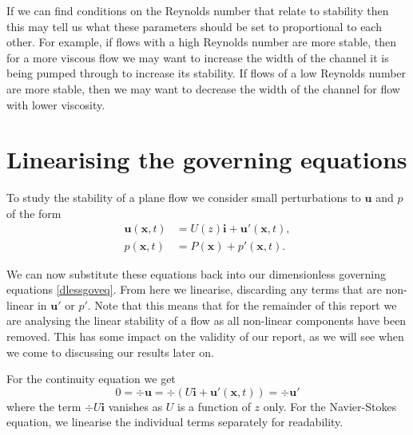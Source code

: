 If we can find conditions on the Reynolds number that relate to stability then this may tell us what these parameters should be set to proportional to each other. For example, if flows with a high Reynolds number are more stable, then for a more viscous flow we may want to increase the width of the channel it is being pumped through to increase its stability. If flows of a low Reynolds number are more stable, then we may want to decrease the width of the channel for flow with lower viscosity.

\section{Linearising the governing equations}

To study the stability of a plane flow we consider small perturbations to $ \mathbf{u} $ and $ p $ of the form
\begin{align}
    \mathbf{u}(\mathbf{x}, t) &= U(z) \mathbf{i} + \mathbf{u}'(\mathbf{x}, t), \nonumber\\
    p(\mathbf{x}, t) &= P(\mathbf{x}) + p'(\mathbf{x}, t).
\end{align}

We can now substitute these equations back into our dimensionless governing equations \eqref{dlessgoveq}. From here we linearise, discarding any terms that are non-linear in  $ \mathbf{u}' $ or  $ p' $. Note that this means that for the remainder of this report we are analysing the linear stability of a flow as all non-linear components have been removed. This has some impact on the validity of our report, as we will see when we come to discussing our results later on.

For the continuity equation we get
\begin{equation}
    0 = \div{\mathbf{u}} =  \div{( U \mathbf{i} + \mathbf{u}'(\mathbf{x}, t))} = \div{\mathbf{u}'}
\label{contlin}
\end{equation} 
where the term $ \div{U \mathbf{i}} $ vanishes as $ U $ is a function of $ z $ only.
For the Navier-Stokes equation, we linearise the individual terms separately for readability. 

